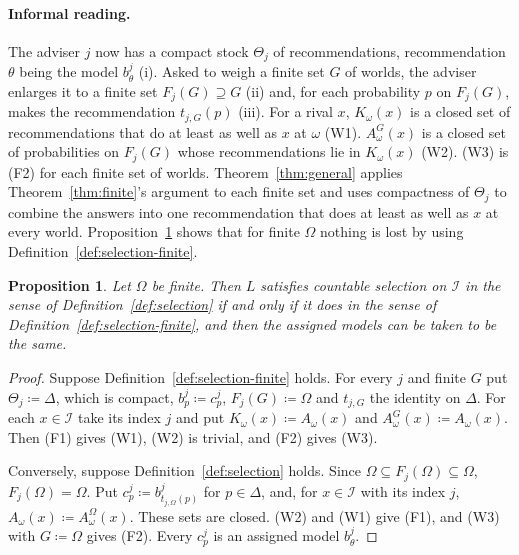 \documentclass[11pt]{article}
\newtheorem{proposition}[theorem]{Proposition}
\theoremstyle{definition}
\theoremstyle{remark}
\newcommand{\I}{\mathcal I}
\begin{document}
{\color{red}\paragraph{Informal reading.} The adviser $j$ now has a compact stock $\Theta_j$ of recommendations, recommendation $\theta$ being the model $b^j_\theta$ (i). Asked to weigh a finite set $G$ of worlds, the adviser enlarges it to a finite set $F_j(G)\supseteq G$ (ii) and, for each probability $p$ on $F_j(G)$, makes the recommendation $t_{j,G}(p)$ (iii). For a rival $x$, $K_\omega(x)$ is a closed set of recommendations that do at least as well as $x$ at $\omega$ (W1). $A^G_\omega(x)$ is a closed set of probabilities on $F_j(G)$ whose recommendations lie in $K_\omega(x)$ (W2). (W3) is (F2) for each finite set of worlds. Theorem~\ref{thm:general} applies Theorem~\ref{thm:finite}'s argument to each finite set and uses compactness of $\Theta_j$ to combine the answers into one recommendation that does at least as well as $x$ at every world. Proposition~\ref{prop:finite-reduction} shows that for finite $\Omega$ nothing is lost by using Definition~\ref{def:selection-finite}.}

\begingroup\color{red}
\begin{proposition}\label{prop:finite-reduction}
Let $\Omega$ be finite. Then $L$ satisfies countable selection on $\I$ in the sense of Definition~\ref{def:selection} if and only if it does in the sense of Definition~\ref{def:selection-finite}, and then the assigned models can be taken to be the same.
\end{proposition}
\begin{proof}
Suppose Definition~\ref{def:selection-finite} holds. For every $j$ and finite $G$ put $\Theta_j\coloneqq\Delta$, which is compact, $b^j_p\coloneqq c^j_p$, $F_j(G)\coloneqq\Omega$ and $t_{j,G}$ the identity on $\Delta$. For each $x\in\I$ take its index $j$ and put $K_\omega(x)\coloneqq A_\omega(x)$ and $A^G_\omega(x)\coloneqq A_\omega(x)$. Then (F1) gives (W1), (W2) is trivial, and (F2) gives (W3).

Conversely, suppose Definition~\ref{def:selection} holds. Since $\Omega\subseteq F_j(\Omega)\subseteq\Omega$, $F_j(\Omega)=\Omega$. Put $c^j_p\coloneqq b^j_{t_{j,\Omega}(p)}$ for $p\in\Delta$, and, for $x\in\I$ with its index $j$, $A_\omega(x)\coloneqq A^\Omega_\omega(x)$. These sets are closed. (W2) and (W1) give (F1), and (W3) with $G\coloneqq\Omega$ gives (F2). Every $c^j_p$ is an assigned model $b^j_\theta$.
\end{proof}
\endgroup
\end{document}
